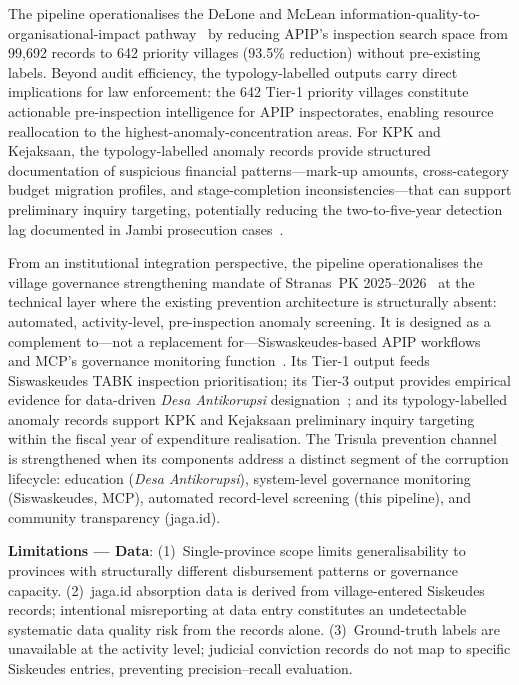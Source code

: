 \documentclass[3p,times,procedia]{elsarticle}
\begin{document}
The pipeline operationalises the DeLone and McLean information-quality-to-organisational-impact pathway~\cite{ref31} by reducing APIP's inspection search space from 99,692 records to 642 priority villages (93.5\% reduction) without pre-existing labels. Beyond audit efficiency, the typology-labelled outputs carry direct implications for law enforcement: the 642 Tier-1 priority villages constitute actionable pre-inspection intelligence for APIP inspectorates, enabling resource reallocation to the highest-anomaly-concentration areas. For KPK and Kejaksaan, the typology-labelled anomaly records provide structured documentation of suspicious financial patterns---mark-up amounts, cross-category budget migration profiles, and stage-completion inconsistencies---that can support preliminary inquiry targeting, potentially reducing the two-to-five-year detection lag documented in Jambi prosecution cases~\cite{ref15,ref16,ref17,ref18}.

From an institutional integration perspective, the pipeline operationalises the village governance strengthening mandate of Stranas~PK 2025--2026~\cite{ref7} at the technical layer where the existing prevention architecture is structurally absent: automated, activity-level, pre-inspection anomaly screening. It is designed as a complement to---not a replacement for---Siswaskeudes-based APIP workflows~\cite{ref6} and MCP's governance monitoring function~\cite{ref8}. Its Tier-1 output feeds Siswaskeudes TABK inspection prioritisation; its Tier-3 output provides empirical evidence for data-driven \textit{Desa Antikorupsi} designation~\cite{ref5}; and its typology-labelled anomaly records support KPK and Kejaksaan preliminary inquiry targeting within the fiscal year of expenditure realisation. The Trisula prevention channel~\cite{ref4} is strengthened when its components address a distinct segment of the corruption lifecycle: education (\textit{Desa Antikorupsi}), system-level governance monitoring (Siswaskeudes, MCP), automated record-level screening (this pipeline), and community transparency (jaga.id).

\textbf{Limitations --- Data}: (1)~Single-province scope limits generalisability to provinces with structurally different disbursement patterns or governance capacity. (2)~jaga.id absorption data is derived from village-entered Siskeudes records; intentional misreporting at data entry constitutes an undetectable systematic data quality risk from the records alone. (3)~Ground-truth labels are unavailable at the activity level; judicial conviction records do not map to specific Siskeudes entries, preventing precision--recall evaluation.
\end{document}
